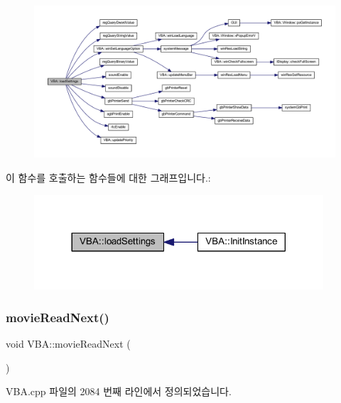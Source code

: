 \begin{figure}[H]
\begin{center}
\leavevmode
\includegraphics[width=350pt]{class_v_b_a_aed48a7db8cc5b65a1e495661f6040915_cgraph}
\end{center}
\end{figure}
이 함수를 호출하는 함수들에 대한 그래프입니다.\+:
\nopagebreak
\begin{figure}[H]
\begin{center}
\leavevmode
\includegraphics[width=305pt]{class_v_b_a_aed48a7db8cc5b65a1e495661f6040915_icgraph}
\end{center}
\end{figure}
\mbox{\label{class_v_b_a_a0f0d982604ac77d23e7fd474c4ebbe2c}} 
\subsubsection{\texorpdfstring{movie\+Read\+Next()}{movieReadNext()}}
{\footnotesize\ttfamily void V\+B\+A\+::movie\+Read\+Next (\begin{DoxyParamCaption}{ }\end{DoxyParamCaption})}



V\+B\+A.\+cpp 파일의 2084 번째 라인에서 정의되었습니다.


